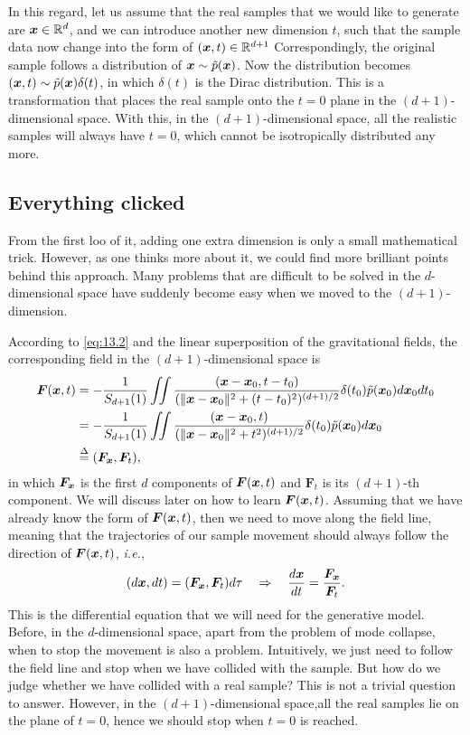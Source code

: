 In this regard, let us assume that the real samples that we would like to generate are  $\bm{x}\in\mathbb{R}^d$, and we can introduce another new dimension $t$, such that the sample data now change into the form of $(\bm{x},t)\in\mathbb{R}^{d+1}$ Correspondingly, the original sample follows a distribution of $\bm{x}\sim \tilde{p}(\bm{x})$. Now the distribution becomes $(\bm{x},t)\sim\tilde{p}(\bm{x})\delta(t)$, in which $\delta (t)$ is the Dirac distribution. This is a transformation that places the real sample onto the $t=0$ plane in the $(d+1)$-dimensional space. With this, in the $(d+1)$-dimensional space, all the realistic samples will always have $t=0$, which cannot be isotropically distributed any more.

\subsection{Everything clicked}

From the first loo of it, adding one extra dimension is only a small mathematical trick. However, as one thinks more about it, we could find more brilliant points behind this approach. Many problems that are difficult to be solved in the $d$-dimensional space have suddenly become easy when we moved to the $(d+1)$-dimension.

According to \cref{eq:13.2} and the linear superposition of the gravitational fields, the corresponding field in the $(d+1)$-dimensional space is
\begin{align}
    \bm{F}(\bm{x},t)&=-\frac{1}{S_{d+1}(1)}\iint\frac{(\bm{x}-\bm{x}_0,t-t_0)}{(\|\bm{x}-\bm{x}_0\|^2+(t-t_0)^2)^{(d+1)/2}}\delta (t_0)\tilde{p}(\bm{x}_0)d\bm{x}_0 dt_0 \nonumber\\
    &=-\frac{1}{S_{d+1}(1)}\iint\frac{(\bm{x}-\bm{x}_0,t)}{(\|\bm{x}-\bm{x}_0\|^2+t^2)^{(d+1)/2}}\delta (t_0)\tilde{p}(\bm{x}_0)d\bm{x}_0 \label{eq:13.3}\\
    &\overset{\Delta}{=} (\bm{F}_{\bm{x}},\bm{F}_t),\nonumber
\end{align}
in which $\bm{F}_{\bm{x}}$ is the first $d$ components of $\bm{F}(\bm{x},t)$ and $\bm{F}_t$ is its $(d+1)$-th component. We will discuss later on how to learn $\bm{F}(\bm{x},t)$. Assuming that we have already know the form of $\bm{F}(\bm{x},t)$, then we need to move along the field line, meaning that the trajectories of our sample movement should always follow the direction of $\bm{F}(\bm{x},t)$, \textit{i.e.},
\begin{equation}
    \label{eq:13.4}
    (d\bm{x}, dt)=(\bm{F}_{\bm{x}},\bm{F}_t )d\tau \quad \Rightarrow\quad \frac{d\bm{x}}{dt}=\frac{\bm{F}_{\bm{x}}}{\bm{F}_t}.
\end{equation}
This is the differential equation that we will need for the generative model. Before, in the $d$-dimensional space, apart from the problem of mode collapse, when to stop the movement is also a problem. Intuitively, we just need to follow the field line and stop when we have collided with the sample. But how do we judge whether we have collided with a real sample? This is not a trivial question to answer. However, in the $(d+1)$-dimensional space,all the real samples lie on the plane of $t=0$, hence we should stop when $t=0$ is reached.

